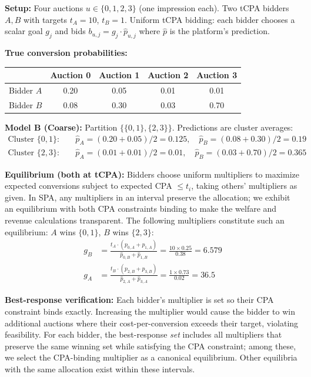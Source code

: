 \documentclass{article}
\theoremstyle{plain}
\theoremstyle{definition}
\theoremstyle{remark}
\begin{document}
\textbf{Setup:} Four auctions $u \in \{0,1,2,3\}$ (one impression each). Two tCPA bidders $A, B$ with targets $t_A = 10$, $t_B = 1$. Uniform tCPA bidding: each bidder chooses a scalar goal $g_j$ and bids $b_{u,j} = g_j \cdot \hat{p}_{u,j}$ where $\hat{p}$ is the platform's prediction.

\textbf{True conversion probabilities:}
\begin{center}
\begin{tabular}{lcccc}
\toprule
& Auction 0 & Auction 1 & Auction 2 & Auction 3 \\
\midrule
Bidder $A$ & 0.20 & 0.05 & 0.01 & 0.01 \\
Bidder $B$ & 0.08 & 0.30 & 0.03 & 0.70 \\
\bottomrule
\end{tabular}
\end{center}

\textbf{Model B (Coarse):} Partition $\{\{0,1\}, \{2,3\}\}$. Predictions are cluster averages:
\begin{align}
\text{Cluster } \{0,1\}: \quad &\hat{p}_A = (0.20+0.05)/2 = 0.125, \quad \hat{p}_B = (0.08+0.30)/2 = 0.19 \\
\text{Cluster } \{2,3\}: \quad &\hat{p}_A = (0.01+0.01)/2 = 0.01, \quad \hat{p}_B = (0.03+0.70)/2 = 0.365
\end{align}

\textbf{Equilibrium (both at tCPA):} Bidders choose uniform multipliers to maximize expected conversions subject to expected CPA $\leq t_i$, taking others' multipliers as given. In SPA, any multipliers in an interval preserve the allocation; we exhibit an equilibrium with both CPA constraints binding to make the welfare and revenue calculations transparent. The following multipliers constitute such an equilibrium: $A$ wins $\{0,1\}$, $B$ wins $\{2,3\}$:
\begin{align}
g_B &= \frac{t_A \cdot (p_{0,A} + p_{1,A})}{\hat{p}_{0,B} + \hat{p}_{1,B}} = \frac{10 \times 0.25}{0.38} = 6.579 \\
g_A &= \frac{t_B \cdot (p_{2,B} + p_{3,B})}{\hat{p}_{2,A} + \hat{p}_{3,A}} = \frac{1 \times 0.73}{0.02} = 36.5
\end{align}

\textbf{Best-response verification:} Each bidder's multiplier is set so their CPA constraint binds exactly. Increasing the multiplier would cause the bidder to win additional auctions where their cost-per-conversion exceeds their target, violating feasibility. For each bidder, the best-response \emph{set} includes all multipliers that preserve the same winning set while satisfying the CPA constraint; among these, we select the CPA-binding multiplier as a canonical equilibrium. Other equilibria with the same allocation exist within these intervals.
\end{document}
